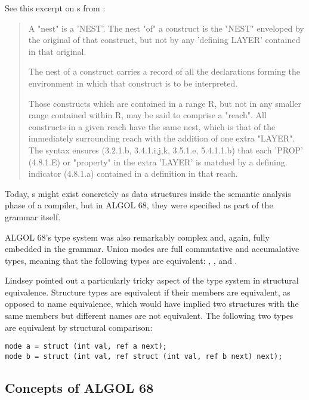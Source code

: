 See this excerpt on s from
\cite[Section 3.0.2, Semantics]{revised_report_on_the_algorithmic_language_algol_68_1976}:
\begin{quotation}
	A "nest" is a 'NEST'. The nest "of" a construct is the "NEST" enveloped
	by the original of that construct, but not by any 'defining LAYER'
	contained in that original.

		{The nest of a construct carries a record of all the declarations forming
			the environment in which that construct is to be interpreted.

			Those constructs which are contained in a range R, but not in any
			smaller range contained within R, may be said to comprise a "reach". All
			constructs in a given reach have the same nest, which is that of the
			immediately surrounding reach with the addition of one extra "LAYER".
			The syntax ensures (3.2.1.b, 3.4.1.i,j,k, 3.5.1.e, 5.4.1.1.b) that each 'PROP'
			(4.8.1.E) or "property" in the extra 'LAYER' is matched by a defining.
			indicator (4.8.1.a) contained in a definition in that reach.}
\end{quotation}

Today, s might exist concretely as data structures inside the semantic analysis
phase of a compiler, but in ALGOL 68, they were specified as part of the grammar itself.

ALGOL 68's type system was also remarkably complex and, again, fully embedded in the grammar.
Union modes are full commutative and accumalative types, meaning that
the following types are equivalent:
,
, and
.

Lindsey pointed out a particularly tricky aspect of the type system in structural equivalence.
Structure types are equivalent if their members are equivalent, as opposed to name equivalence,
which would have implied two structures with the same members but different names
are not equivalent.
The following two types are equivalent by structural comparison:
\begin{lstlisting}[language=algol,frame=single]
mode a = struct (int val, ref a next);
mode b = struct (int val, ref struct (int val, ref b next) next);
\end{lstlisting}



\subsection{Concepts of ALGOL 68}

